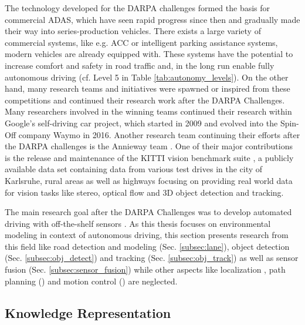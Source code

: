 The technology developed for the \ac{DARPA} challenges formed the basis for commercial \ac{ADAS}, which have seen rapid progress since then and gradually made their way into series-production vehicles.
There exists a large variety of commercial systems, like e.g. \ac{ACC} or intelligent parking assistance systems, modern vehicles are already equipped with.
These systems have the potential to increase comfort and safety in road traffic and, in the long run enable fully autonomous driving (cf. Level 5 in Table \ref{tab:autonomy_levels}).
On the other hand, many research teams and initiatives were spawned or inspired from these competitions and continued their research work after the \ac{DARPA} Challenges.
Many researchers involved in the winning teams continued their research within Google's self-driving car project, which started in 2009 and evolved into the Spin-Off company Waymo \cite{Waymo} in 2016.
Another research team continuing their efforts after the \ac{DARPA} challenges is the Annieway team \cite{Annieway}.
One of their major contributions is the release and maintenance of the KITTI vision benchmark suite \cite{Geiger2013a}, a publicly available data set containing data from various test drives in the city of Karlsruhe, rural areas as well as highways focusing on providing real world data for vision tasks like stereo, optical flow and 3D object detection and tracking.

The main research goal after the \ac{DARPA} Challenges was to develop automated driving with off-the-shelf sensors \cite{Furgale2013}.
As this thesis focuses on environmental modeling in context of autonomous driving, this section presents research from this field like road detection and modeling (Sec. \ref{subsec:lane}), object detection (Sec. \ref{subsec:obj_detect}) and tracking (Sec. \ref{subsec:obj_track}) as well as sensor fusion (Sec. \ref{subsec:sensor_fusion}) while other aspects like localization \cite{Levinson2010, Thrun2005}, path planning () and motion control () are neglected.

\subsection{Knowledge Representation}
\label{subsec:knowledge_representation}

